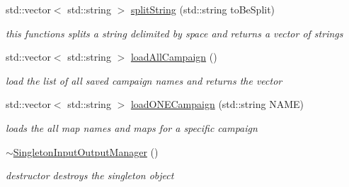 \begin{DoxyCompactItemize}
\hypertarget{class_singleton_input_output_manager_aadd629b10aed904e41a0bc23fae7d232}{}\label{class_singleton_input_output_manager_aadd629b10aed904e41a0bc23fae7d232} 
std\+::vector$<$ std\+::string $>$ \hyperlink{class_singleton_input_output_manager_aadd629b10aed904e41a0bc23fae7d232}{split\+String} (std\+::string to\+Be\+Split)
\begin{DoxyCompactList}\small\item\em this functions splits a string delimited by space and returns a vector of strings \end{DoxyCompactList}\item 
\hypertarget{class_singleton_input_output_manager_afaac41ad14f6a7754d33db8b06a46e50}{}\label{class_singleton_input_output_manager_afaac41ad14f6a7754d33db8b06a46e50} 
std\+::vector$<$ std\+::string $>$ \hyperlink{class_singleton_input_output_manager_afaac41ad14f6a7754d33db8b06a46e50}{load\+All\+Campaign} ()
\begin{DoxyCompactList}\small\item\em load the list of all saved campaign names and returns the vector \end{DoxyCompactList}\item 
\hypertarget{class_singleton_input_output_manager_a7117e0cb3797535748bfb3a508b9d44c}{}\label{class_singleton_input_output_manager_a7117e0cb3797535748bfb3a508b9d44c} 
std\+::vector$<$ std\+::string $>$ \hyperlink{class_singleton_input_output_manager_a7117e0cb3797535748bfb3a508b9d44c}{load\+O\+N\+E\+Campaign} (std\+::string N\+A\+ME)
\begin{DoxyCompactList}\small\item\em loads the all map names and maps for a specific campaign \end{DoxyCompactList}\item 
\hypertarget{class_singleton_input_output_manager_ab5fcf578e08c99b964ae784fb4d2dce9}{}\label{class_singleton_input_output_manager_ab5fcf578e08c99b964ae784fb4d2dce9} 
\hyperlink{class_singleton_input_output_manager_ab5fcf578e08c99b964ae784fb4d2dce9}{$\sim$\+Singleton\+Input\+Output\+Manager} ()
\begin{DoxyCompactList}\small\item\em destructor destroys the singleton object \end{DoxyCompactList}\end{DoxyCompactItemize}
